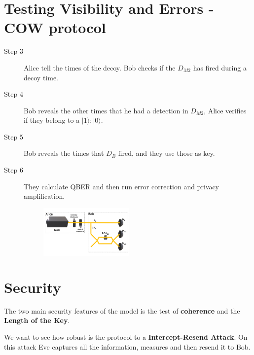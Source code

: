 \documentclass[1000pt]{article}
\newcommand{\mysection}[1]{\section*{\color{black}\sffamily #1}}%
\begin{document}

\mysection{\Huge\textbf{Testing Visibility and Errors - COW protocol}} \Large \vspace*{1cm}
\begin{description}

\item [Step 3] Alice tell the times of the decoy. Bob checks if the $D_{M2}$ has fired during a decoy time.

\item [Step 4] Bob reveals the other times that he had a detection in $D_{M2}$, Alice verifies if they belong to a $|1\rangle:|0\rangle$.

\item [Step 5] Bob reveals the times that $D_B$ fired, and they use those as key.

\item [Step 6] They calculate QBER and then run error correction and privacy amplification.

\begin{figure}[hbt]
    	\centering
    	\includegraphics[width=0.45\textwidth]{./figures/Full2.pdf}
    \end{figure}
\end{description}
\mysection{\Huge\textbf{Security}} \Large \vspace*{1cm}
\begin{description}
\item The two main security features of the model is the test of \textbf{coherence} and the \textbf{Length of the Key}.

\item We want to see how robust is the protocol to a \textbf{Intercept-Resend Attack}. On this attack Eve captures all the information, measures and then resend it to Bob.
\end{description}
\end{document}

